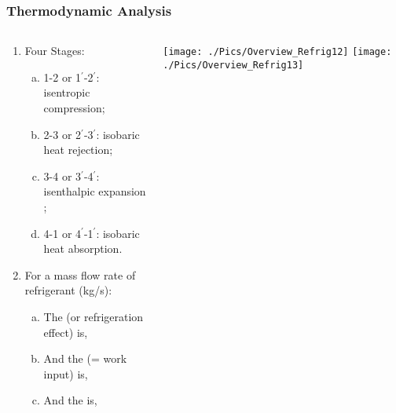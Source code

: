 \documentclass[10pt,compress,handout,unknownkeysallowed]{beamer}
\begin{document}
\begin{frame}
 \frametitle{Thermodynamic Analysis} 
  \begin{columns}
   \begin{column}[c]{0.6\linewidth}
     \begin{enumerate}[(1)]\scriptsize
       \item<1-> Four Stages:
         \begin{enumerate}[(a)]\scriptsize
            \item <1-> 1-2 or 1$^{\prime}$-2$^{\prime}$: isentropic compression;
            \item <1-> 2-3 or 2$^{\prime}$-3$^{\prime}$: isobaric heat rejection;
            \item <1-> 3-4 or 3$^{\prime}$-4$^{\prime}$: isenthalpic expansion ;%
            \item <1-> 4-1 or 4$^{\prime}$-1$^{\prime}$: isobaric heat absorption.
         \end{enumerate}
       \item<2-> For a mass flow rate of refrigerant  (kg/s):
         \begin{enumerate}[(a)]\scriptsize
           \item<2-> The  (or refrigeration effect) is,\\
           \item <3-> And the  (= work input) is,
           \item<4-> And the  is,
         \end{enumerate}
     \end{enumerate}
   \end{column}  
   \begin{column}[c]{0.4\linewidth}
     \vbox{
      \hbox{\texttt{[image: ./Pics/Overview\_Refrig12]}}
      \hbox{\texttt{[image: ./Pics/Overview\_Refrig13]}}}
   \end{column}  


\end{columns}
\end{frame}
\end{document}
